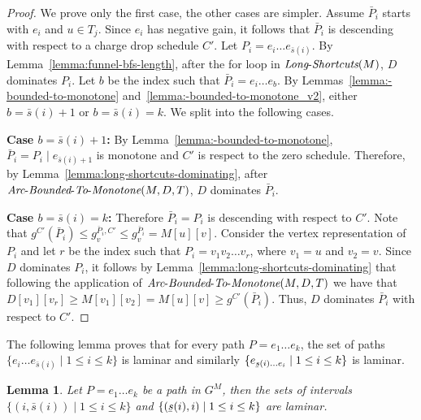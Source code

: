 \documentclass[11pt]{article}
\newtheorem{lemma}[theorem]{Lemma}
\newcommand{\ubar}[1]{\underaccent{\bar}{{#1}}}
\newcommand{\LS}{\mbox{{\it Long}-{\it Shortcuts}}}
\newcommand{\Extend}{\mbox{{\it Arc}-{\it Bounded}-{\it To}-{\it Monotone}}}
\begin{document}
\begin{proof}
    We prove only the first case, the other cases are simpler. Assume $\bar{P}_i$ starts with $e_i$ and $u \in T_j$. Since $e_i$ has negative gain, it follows that $\bar{P}_i$ is descending with respect to a charge drop schedule $C'$. Let $P_i = e_i \ldots e_{\bar{s}(i)}$. By Lemma~\ref{lemma:funnel-bfs-length}, after the for loop in $\LS(M)$, $D$ dominates $P_i$. Let $b$ be the index such that $\bar{P}_i=e_i \ldots e_b$.  By Lemmas~\ref{lemma:-bounded-to-monotone} and~\ref{lemma:-bounded-to-monotone_v2}, either $b= \bar{s}(i)+1$ or $b= \bar{s}(i)=k$. We split into the following cases.

    \textbf{Case $b= \bar{s}(i)+1$:} By Lemma~\ref{lemma:-bounded-to-monotone}, $\bar{P}_i = P_i \mid e_{\bar{s}(i)+1}$ is monotone and $C'$ is respect to the zero schedule. Therefore, by Lemma~\ref{lemma:long-shortcuts-dominating}, after $\Extend(M,D,T)$, $D$ dominates $\bar{P}_i$.

    \textbf{Case $b= \bar{s}(i)=k$:} Therefore $\bar{P}_i = P_i$ is descending with respect to $C'$. Note that $g^{C'}(\bar{P}_i) \le g^{\bar{P}_i,C'}_v  \le g^{\bar{P}_i}_v = M[u][v]$. Consider the vertex representation of $P_i$ and let $r$ be the index such that $P_i = v_1 v_2 \ldots v_r$, where $v_1=u$ and $v_2=v$. Since $D$ dominates $P_i$, it follows by Lemma~\ref{lemma:long-shortcuts-dominating} that following the application of $\Extend(M,D,T)$ we have that $D[v_1][v_r]\ge M[v_1][v_2]=M[u][v]\ge g^{C'}(\bar{P}_i)$. Thus, $D$ dominates $\bar{P}_i$ with respect to $C'$.
     
\end{proof}

The following lemma proves that for every path $P=e_1\ldots e_k$, the set of paths $\{e_i \ldots e_{\bar{s}(i)}\mid 1\le i \le k\}$ is laminar and similarly $\{  e_{\ubar{s}(i) \ldots e_i}\mid 1\le i \le k\}$ is laminar.

\begin{lemma}\label{lemma:laminar}
    Let $P=e_1 \ldots e_k$ be a path in $G^M$, then the sets of intervals $\{(i, \bar{s}(i)) \mid 1\le i \le k \}$ and $\{(\ubar{s}(i), i) \mid 1\le i \le k \}$ are laminar.
\end{lemma}
\end{document}
